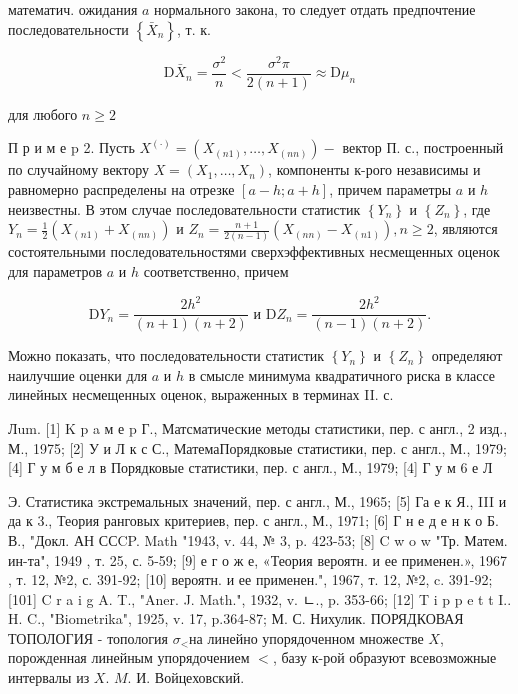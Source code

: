 \documentclass[10pt]{article}
\begin{document}
математич. ожидания $a$ нормального закона, то следует отдать предпочтение последовательности $\left\{\bar{X}_{n}\right\}$, т. к.



\[

\mathrm{D} \bar{X}_{n}=\frac{\sigma^{2}}{n}<\frac{\sigma^{2} \pi}{2(n+1)} \approx \mathrm{D} \mu_{n}

\]



для любого $n \geqslant 2$



П р и м е $\mathrm{p}$ 2. Пусть $X^{(\cdot)}=\left(X_{(n 1)}, \ldots, X_{(n n)}\right)-$ вектор П. с., построенный по случайному вектору $X=\left(X_{1}, \ldots, X_{n}\right)$, компоненты к-рого независимы и равномерно распределены на отрезке $[a-h ; a+h]$, причем параметры $a$ и $h$ неизвестны. В этом случае последовательности статистик $\left\{Y_{n}\right\}$ и $\left\{Z_{n}\right\}$, где $Y_{n}=\frac{1}{2}\left(X_{(n 1)}+X_{(n n)}\right)$ и $Z_{n}=\frac{n+1}{2(n-1)}\left(X_{(n n)}-X_{(n 1)}\right), n \geqslant 2$, являются состоятельными последовательностями сверхэффективных несмещенных оценок для параметров $a$ и $h$ соответственно, причем



\[

\mathrm{D} Y_{n}=\frac{2 h^{2}}{(n+1)(n+2)} \text { и } \mathrm{D} Z_{n}=\frac{2 h^{2}}{(n-1)(n+2)} .

\]



Можно показать, что последовательности статистик $\left\{Y_{n}\right\}$ и $\left\{Z_{n}\right\}$ определяют наилучшие оценки для $a$ и $h$ в смысле минимума квадратичного риска в классе линейных несмещенных оценок, выраженных в терминах II. с.



Лum. [1] K p a м е $\mathrm{p}$ Г., Матсматические методы статистики, пер. с англ., 2 изд., М., 1975; [2] У и Л к с С., МатемаПорядковые статистики, пер. с англ., М., 1979; [4] Г у м б е л в Порядковые статистики, пер. с англ., М., 1979; [4] Г у м 6 е Л

Э. Статистика экстремальных значений, пер. с англ., М., 1965; [5] Га е к Я., III и да к 3., Теория ранговых критериев, пер. с англ., М., 1971; [6] Г н е д е н к о Б. В., "Докл. АН ССCP. Math "1943, v. 44, № 3, p. 423-53; [8] C w o w "Тр. Матем. ин-та", 1949 , т. 25, с. 5-59; [9] е г о ж е, «Теория вероятн. и ее применен.», 1967 , т. 12, №2, с. 391-92; [10] вероятн. и ее применен.", 1967, т. 12, №2, c. 391-92; [101] C r a i g A. T., "Aner. J. Math.", 1932, v. ㄴ., p. 353-66; [12] T i p p e t t I.. H. C., "Biometrika", 1925, v. 17, p.364-87; М. С. Нихулик. ПОРЯДКОВАЯ ТОПОЛОГИЯ - топология $\mathscr{\sigma}_{<}$на линейно упорядоченном множестве $X$, порожденная линейным упорядочением $<$, базу к-рой образуют всевозможные интервалы из $X$. $M$. И. Войцеховский.
\end{document}
